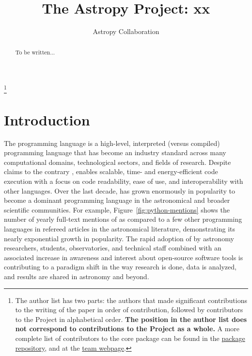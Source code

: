 \documentclass[modern]{aastex631}
\begin{document}
\draft{\today}

\title{The Astropy Project: xx}


\author{Astropy Collaboration}
\noaffiliation
{\let\thefootnote\relax\footnote{{The author list has two parts: the authors that made significant contributions to the writing of the paper in order of contribution, followed by contributors to the \astropy Project in alphabetical order. \textbf{The position in the author list does not correspond to contributions to the \astropy Project as a whole.} A more complete list of contributors to the core package can be found in the \href{https://github.com/astropy/astropy/graphs/contributors}{package repository}, and at the \href{http://www.astropy.org/team.html}{\astropy team webpage}.}}}

% 

\begin{abstract}

    To be written...

\end{abstract}



\section{Introduction} \label{sec:intro}

The \python programming language is a high-level, interpreted (versus compiled)
programming language that has become an industry standard across many
computational domains, technological sectors, and fields of research.
Despite claims to the contrary \citep{Portegies-Zwart:2020}, \python enables
scalable, time- and energy-efficient code execution \citep[e.g.,][]{Augier:2021}
with a focus on code readability, ease of use, and interoperability with other
languages.
Over the last decade, \python has grown enormously in popularity to become a
dominant programming language in the astronomical and broader scientific
communities.
For example, Figure~\ref{fig:python-mentions} shows the number of yearly
full-text mentions of \python as compared to a few other programming languages
in refereed articles in the astronomical literature, demonstrating its nearly
exponential growth in popularity.
The rapid adoption of \python by astronomy researchers, students, observatories,
and technical staff combined with an associated increase in awareness and
interest about open-source software tools is contributing to a paradigm shift in
the way research is done, data is analyzed, and results are shared in astronomy
and beyond.
\end{document}
